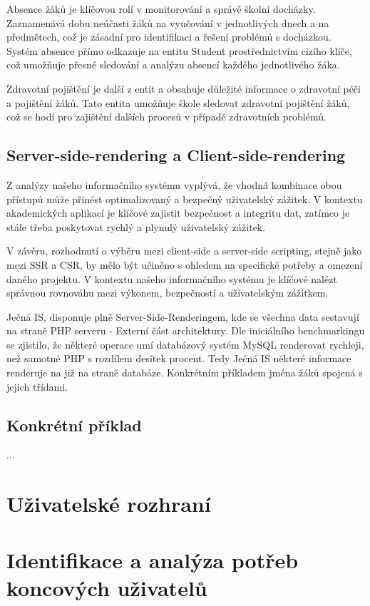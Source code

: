 \documentclass[FM,Proj]{tulthesis}
\begin{document}
Absence žáků je klíčovou rolí v monitorování a správě školní docházky. 
Zaznamenává dobu neúčasti žáků na vyučování v jednotlivých dnech a na 
předmětech, což je zásadní pro identifikaci a řešení problémů s docházkou.
Systém absence přímo odkazuje na entitu Student prostřednictvím cizího klíče,
což umožňuje přesné sledování a analýzu absencí každého jednotlivého žáka.

Zdravotní pojištění je další z entit a obsahuje důležité informace o zdravotní
péči a pojištění žáků. Tato entita umožňuje škole sledovat zdravotní pojištění
žáků, což se hodí pro zajištění dalších procesů v případě zdravotních
problémů.

\subsection*{Server-side-rendering a Client-side-rendering}

Z analýzy našeho informačního systému vyplývá, že vhodná kombinace obou přístupů může 
přinést optimalizovaný a bezpečný uživatelský zážitek. V kontextu akademických aplikací
je klíčové zajistit bezpečnost a integritu dat, zatímco je stále třeba poskytovat 
rychlý a plynulý uživatelský zážitek.

V závěru, rozhodnutí o výběru mezi client-side a server-side scripting,
stejně jako mezi SSR a CSR, by mělo být učiněno s ohledem na specifické potřeby a omezení 
daného projektu. V kontextu našeho informačního systému je klíčové nalézt správnou 
rovnováhu mezi výkonem, bezpečností a uživatelským zážitkem.

Ječná IS, disponuje plně Server-Side-Renderingem, kde se všechna data sestavují na straně
PHP serveru - Externí část architektury. Dle iniciálního benchmarkingu se zjistilo, že
některé operace umí databázový systém MySQL renderovat rychleji, než samotné PHP s rozdílem
desítek procent. Tedy Ječná IS některé informace renderuje na již na straně databáze. 
Konkrétním příkladem jména žáků spojená s jejich třídami.

\subsection*{Konkrétní příklad}
...

\section{Uživatelské rozhraní}

\section{Identifikace a analýza potřeb koncových uživatelů}
\end{document}
